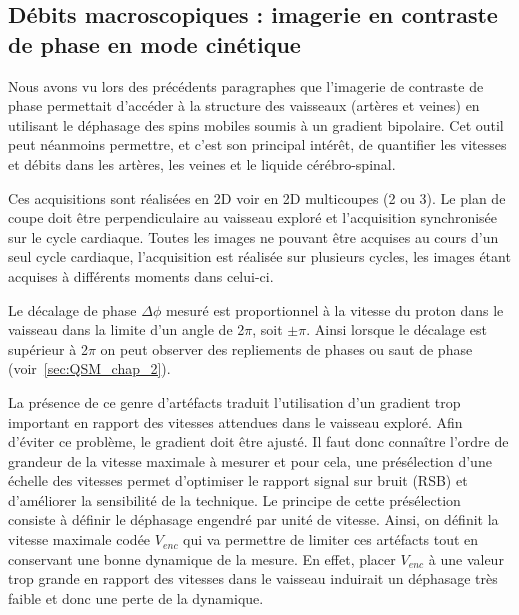 \subsection{Débits macroscopiques : imagerie en contraste de phase en mode cinétique}
Nous avons vu lors des précédents paragraphes que l’imagerie de contraste de phase
permettait d’accéder à la structure des vaisseaux (artères et veines) en utilisant le déphasage des spins
mobiles soumis à un gradient bipolaire. Cet outil peut néanmoins permettre, et c’est son principal
intérêt, de quantifier les vitesses et débits dans les artères, les veines et le liquide cérébro-spinal.

Ces acquisitions sont réalisées en 2D voir en 2D multicoupes (2 ou 3). Le plan de coupe doit être
perpendiculaire au vaisseau exploré et l’acquisition synchronisée sur le cycle cardiaque. Toutes les
images ne pouvant être acquises au cours d’un seul cycle cardiaque, l’acquisition est réalisée sur
plusieurs cycles, les images étant acquises à différents moments dans celui-ci.

Le décalage de phase $\Delta \phi$ mesuré est proportionnel à la vitesse du proton dans le vaisseau dans
la limite d’un angle de 2$\pi$, soit $\pm \pi$. Ainsi lorsque le décalage est supérieur à 2$\pi$ on peut observer des
repliements de phases ou saut de phase (voir~\ref{sec:QSM_chap_2}).

La présence de ce genre d’artéfacts traduit l’utilisation d’un gradient trop important en rapport
des vitesses attendues dans le vaisseau exploré. Afin d’éviter ce problème, le gradient doit être ajusté.
Il faut donc connaître l’ordre de grandeur de la vitesse maximale à mesurer et pour cela, une
présélection d’une échelle des vitesses permet d’optimiser le rapport signal sur bruit (RSB) et
d’améliorer la sensibilité de la technique. Le principe de cette présélection consiste à définir le
déphasage engendré par unité de vitesse. Ainsi, on définit la vitesse maximale codée $V_{enc}$ qui va
permettre de limiter ces artéfacts tout en conservant une bonne dynamique de la mesure. En effet,
placer $V_{enc}$ à une valeur trop grande en rapport des vitesses dans le vaisseau induirait un déphasage
très faible et donc une perte de la dynamique.

